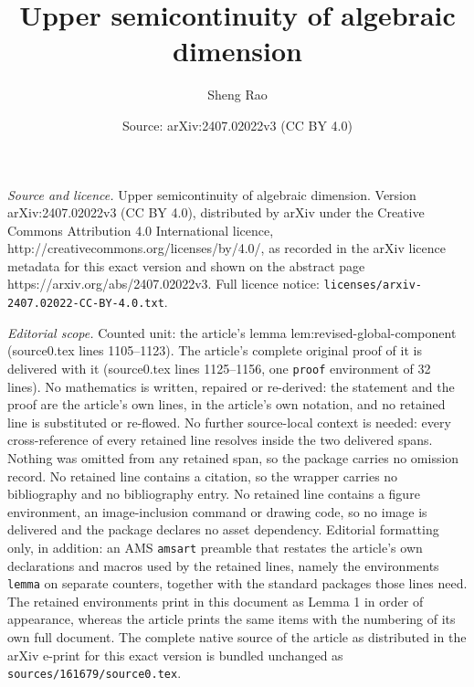 \documentclass[10pt,a4paper]{amsart}
\title{Upper semicontinuity of algebraic dimension}
\author{Sheng Rao}
\date{Source: arXiv:2407.02022v3 (CC BY 4.0)}
\begin{document}
\maketitle

\noindent\emph{Source and licence.} Upper semicontinuity of algebraic dimension. Version arXiv:2407.02022v3 (CC BY 4.0), distributed by arXiv under the Creative Commons Attribution 4.0 International licence, http://creativecommons.org/licenses/by/4.0/, as recorded in the arXiv licence metadata for this exact version and shown on the abstract page https://arxiv.org/abs/2407.02022v3. Full licence notice: \texttt{licenses/arxiv-2407.02022-CC-BY-4.0.txt}.\par\smallskip

\noindent\textit{Editorial scope.} Counted unit: the article's lemma lem:revised-global-component (source0.tex lines 1105--1123). The article's complete original proof of it is delivered with it (source0.tex lines 1125--1156, one \texttt{proof} environment of 32 lines). No mathematics is written, repaired or re-derived: the statement and the proof are the article's own lines, in the article's own notation, and no retained line is substituted or re-flowed.  No further source-local context is needed: every cross-reference of every retained line resolves inside the two delivered spans.  Nothing was omitted from any retained span, so the package carries no omission record.  No retained line contains a citation, so the wrapper carries no bibliography and no bibliography entry.  No retained line contains a figure environment, an image-inclusion command or drawing code, so no image is delivered and the package declares no asset dependency.  Editorial formatting only, in addition: an AMS \texttt{amsart} preamble that restates the article's own declarations and macros used by the retained lines, namely the environments \texttt{lemma} on separate counters, together with the standard packages those lines need.  The retained environments print in this document as Lemma 1 in order of appearance, whereas the article prints the same items with the numbering of its own full document.  The complete native source of the article as distributed in the arXiv e-print for this exact version is bundled unchanged as \texttt{sources/161679/source0.tex}.
\end{document}
